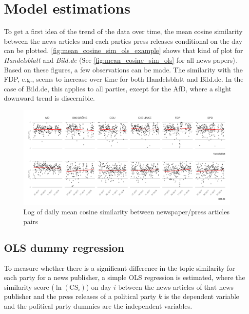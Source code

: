 \documentclass[
]{article}
\begin{document}
\hypertarget{model-estimations}{%
\section{Model estimations}\label{model-estimations}}

To get a first idea of the trend of the data over time, the mean cosine
similarity between the news articles and each parties press releases
conditional on the day can be plotted.
\autoref{fig:mean_cosine_sim_ols_example} shows that kind of plot for
\emph{Handelsblatt} and \emph{Bild.de} (See
\autoref{fig:mean_cosine_sim_ols} for all news papers). Based on these
figures, a few observations can be made. The similarity with the FDP,
e.g., seems to increase over time for both Handelsblatt and Bild.de. In
the case of Bild.de, this applies to all parties, except for the AfD,
where a slight downward trend is discernible.

\begin{figure}

{\centering \includegraphics[width=0.9\linewidth]{main_text_files/figure-latex/Daily mean cosine similarity - example-1} 

}

\caption{Log of daily mean cosine similarity between newspaper/press articles pairs \label{fig:mean_cosine_sim_ols_example}}\label{fig:Daily mean cosine similarity - example}
\end{figure}

\hypertarget{ols-dummy-regression}{%
\subsection{OLS dummy regression}\label{ols-dummy-regression}}

To measure whether there is a significant difference in the topic
similarity for each party for a news publisher, a simple OLS regression
is estimated, where the similarity score (\(\ln(\text{CS}_{i})\)) on day
\(i\) between the news articles of that news publisher and the press
releases of a political party \(k\) is the dependent variable and the
political party dummies are the independent variables.
\end{document}
